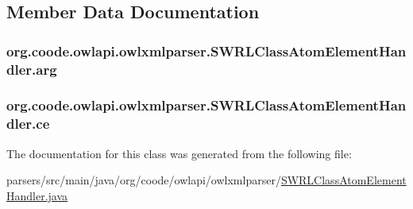 \subsection{Member Data Documentation}
\hypertarget{classorg_1_1coode_1_1owlapi_1_1owlxmlparser_1_1_s_w_r_l_class_atom_element_handler_af922ad7b813053cbeccb38f1325e6325}{
\subsubsection[{arg}]{ org.\-coode.\-owlapi.\-owlxmlparser.\-S\-W\-R\-L\-Class\-Atom\-Element\-Handler.\-arg\hspace{0.3cm}{\ttfamily [private]}}}\label{classorg_1_1coode_1_1owlapi_1_1owlxmlparser_1_1_s_w_r_l_class_atom_element_handler_af922ad7b813053cbeccb38f1325e6325}
\hypertarget{classorg_1_1coode_1_1owlapi_1_1owlxmlparser_1_1_s_w_r_l_class_atom_element_handler_aed20570918c743b9bfa1ec28bafd15a8}{
\subsubsection[{ce}]{ org.\-coode.\-owlapi.\-owlxmlparser.\-S\-W\-R\-L\-Class\-Atom\-Element\-Handler.\-ce\hspace{0.3cm}{\ttfamily [private]}}}\label{classorg_1_1coode_1_1owlapi_1_1owlxmlparser_1_1_s_w_r_l_class_atom_element_handler_aed20570918c743b9bfa1ec28bafd15a8}


The documentation for this class was generated from the following file\-:\begin{DoxyCompactItemize}
\item 
parsers/src/main/java/org/coode/owlapi/owlxmlparser/\hyperlink{_s_w_r_l_class_atom_element_handler_8java}{S\-W\-R\-L\-Class\-Atom\-Element\-Handler.\-java}\end{DoxyCompactItemize}
